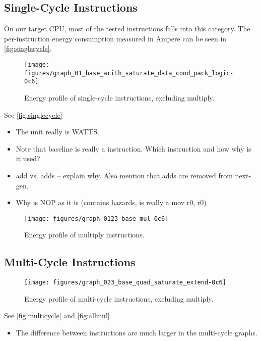 

\subsection{Single-Cycle Instructions}
On our target CPU, most of  the tested instructions falls into
this category. The per-instruction energy consumption measured in Ampere can be
seen in \autoref{fig:singlecycle}.

\begin{figure*}
    \centering
    \texttt{[image: figures/graph\_01\_base\_arith\_saturate\_data\_cond\_pack\_logic-0c6]}
    \caption{Energy profile of single-cycle instructions, excluding multiply.}
    \label{fig:singlecycle}
\end{figure*}

See \autoref{fig:singlecycle}
\begin{itemize}
    \item The unit really is WATTS.
    \item Note that baseline is really a instruction. Which instruction and how
        why is it used?
    \item add vs. adds -- explain why. Also mention that adds are removed from
        next-gen.
    \item Why is NOP as it is (contains hazards, is really a mov r0, r0)
\end{itemize}

\begin{figure*}
    \centering
    \texttt{[image: figures/graph\_0123\_base\_mul-0c6]}
    \caption{Energy profile of multiply instructions.}
    \label{fig:allmul}
\end{figure*}


\subsection{Multi-Cycle Instructions}
\begin{figure}
    \centering
    \texttt{[image: figures/graph\_023\_base\_quad\_saturate\_extend-0c6]}
    \caption{Energy profile of multi-cycle instructions, excluding multiply.}
    \label{fig:multicycle}
\end{figure}

See \autoref{fig:multicycle} and \autoref{fig:allmul}
\begin{itemize}
    \item The difference between instructions are much larger in the multi-cycle
        graphs.
\end{itemize}
